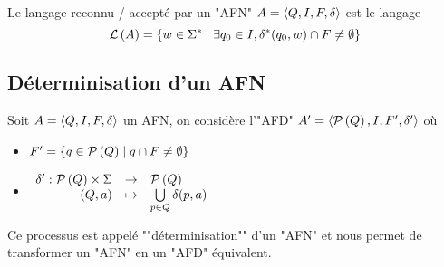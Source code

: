 \begin{definition}
	Le langage reconnu / accepté par un "AFN" $A = \langle Q, I, F, \delta \rangle$ est le langage
	$$ \mathcal{L}\left(A\right) = \left\{w \in \Sigma^{*} \mid \exists q_0 \in I, \delta^{*}(q_0, w) \cap F \neq \emptyset\right\} $$

\end{definition}

\subsection{Déterminisation d'un AFN}

Soit $A = \langle Q, I, F, \delta \rangle$ un AFN, on considère l'"AFD" $A' = \langle \mathcal{P}\left(Q\right), I, F', \delta' \rangle$ où
\begin{itemize}
	\item $F' = \left\{q \in \mathcal{P}\left(Q\right) \mid q \cap F \neq \emptyset\right\}$
	      \vspace{0.25cm}
	\item $ \begin{array}{rcl}
			      \delta' : \mathcal{P}\left(Q\right) \times \Sigma & \to     & \mathcal{P}\left(Q\right)                              \\
			      (Q, a)                              & \mapsto & \bigcup\limits_{p \in Q} \delta(p, a)
		      \end{array} $
\end{itemize}

\vspace{0.25cm}

Ce processus est appelé ""déterminisation"" d'un "AFN" et nous permet de transformer un "AFN" en un "AFD" équivalent.

